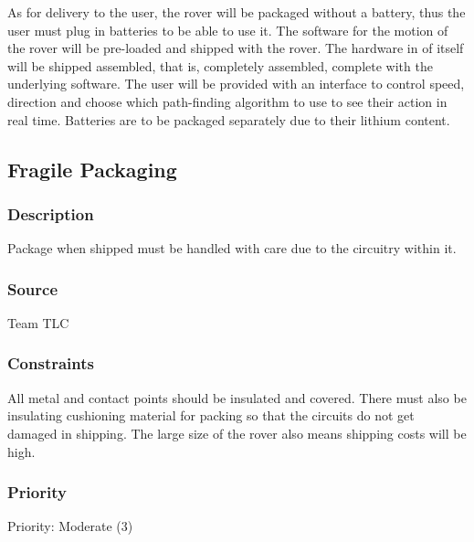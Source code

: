 

As for delivery to the user, the rover will be packaged without a battery, thus the user must plug in batteries to be able to use it. The software for the motion of the rover will be pre-loaded and shipped with the rover. The hardware in of itself will be shipped assembled, that is, completely assembled, complete with the underlying software. The user will be provided with an interface to control speed, direction and choose which path-finding algorithm to use to see their action in real time. Batteries are to be packaged separately due to their lithium content.

\subsection{Fragile Packaging}
\subsubsection{Description}
Package when shipped must be handled with care due to the circuitry within it.
\subsubsection{Source}
Team TLC
\subsubsection{Constraints}
All metal and contact points should be insulated and covered. There must also be insulating cushioning material for packing so that the circuits do not get damaged in shipping. The large size of the rover also means shipping costs will be high.
\subsubsection{Priority}
Priority: Moderate (3)

